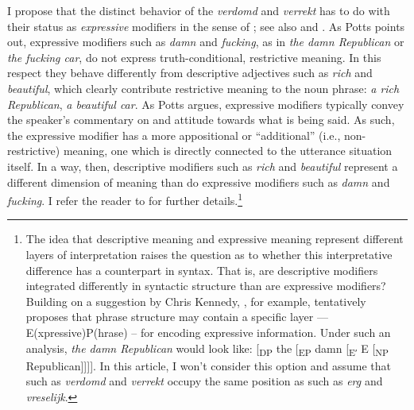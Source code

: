 \documentclass[output=paper]{langsci/langscibook}
\begin{document}
I propose that the distinct behavior of the  \emph{verdomd}
and \emph{verrekt} has to do with their status as \emph{expressive} modifiers
in the sense of \textcite{Potts2005}; see also \textcite{Potts2007} and
\citet{Morzycki2008}. As Potts points out,  expressive modifiers such as
\emph{damn} and \emph{fucking}, as in \emph{the damn Republican} or \emph{the
fucking car}, do not express truth-conditional, restrictive meaning. In this
respect they behave differently from descriptive adjectives such as \emph{rich}
and \emph{beautiful}, which clearly contribute restrictive meaning to the noun
phrase: \emph{a rich Republican}, \emph{a beautiful car}. As Potts argues,
expressive modifiers typically convey the speaker's commentary on and attitude
towards what is being said. As such, the expressive modifier has a more
appositional or \enquote{additional} (i.e., non-restrictive) meaning, one which
is directly connected to the utterance situation itself. In a way, then,
descriptive modifiers such as \emph{rich} and \emph{beautiful} represent a
different dimension of meaning than do expressive modifiers such as \emph{damn}
and \emph{fucking}. I refer the reader to \textcite{Potts2005,Potts2007} for
further details.\footnote{The idea that descriptive meaning and expressive
    meaning represent different layers of interpretation raises the question as
    to whether this interpretative difference has a counterpart in syntax. That
    is, are descriptive modifiers integrated differently in syntactic structure
    than are expressive modifiers? Building on a suggestion by Chris Kennedy,
    \citet{Morzycki2008}, for example, tentatively proposes that phrase
    structure may contain a specific layer — E(xpressive)P(hrase) – for
    encoding expressive information. Under such an analysis, \emph{the damn
    Republican} would look like: [\textsubscript{DP} the [\textsubscript{EP}
    damn [\textsubscript{Eʹ} E [\textsubscript{NP} Republican]]]]. In this
    article, I won't consider this option and assume that 
    such as \emph{verdomd} and \emph{verrekt} occupy the same position as
 such as \emph{erg} and \emph{vreselijk}.}
\end{document}
